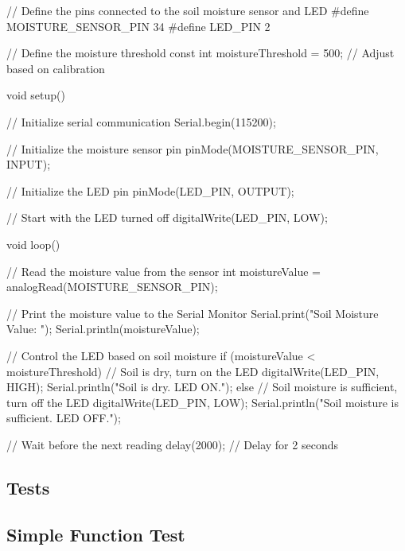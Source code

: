\begin{Arduino}
	// Define the pins connected to the soil moisture sensor and LED
	#define MOISTURE_SENSOR_PIN 34
	#define LED_PIN 2
	
	// Define the moisture threshold
	const int moistureThreshold = 500; // Adjust based on calibration
	
	void setup() {
		// Initialize serial communication
		Serial.begin(115200);
		
		// Initialize the moisture sensor pin
		pinMode(MOISTURE_SENSOR_PIN, INPUT);
		
		// Initialize the LED pin
		pinMode(LED_PIN, OUTPUT);
		
		// Start with the LED turned off
		digitalWrite(LED_PIN, LOW);
	}
	
	void loop() {
		// Read the moisture value from the sensor
		int moistureValue = analogRead(MOISTURE_SENSOR_PIN);
		
		// Print the moisture value to the Serial Monitor
		Serial.print("Soil Moisture Value: ");
		Serial.println(moistureValue);
		
		// Control the LED based on soil moisture
		if (moistureValue < moistureThreshold) {
			// Soil is dry, turn on the LED
			digitalWrite(LED_PIN, HIGH);
			Serial.println("Soil is dry. LED ON.");
		} else {
			// Soil moisture is sufficient, turn off the LED
			digitalWrite(LED_PIN, LOW);
			Serial.println("Soil moisture is sufficient. LED OFF.");
		}
		
		// Wait before the next reading
		delay(2000); // Delay for 2 seconds
	}
	
	
	
\end{Arduino}




\subsection{Tests}

\subsection{Simple Function Test}

